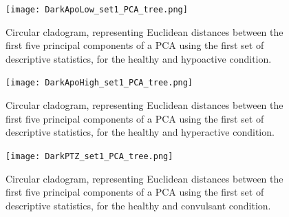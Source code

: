 \documentclass[a4paper,12pt]{article}
\begin{document}
\newpage
\begin{figure}[h!]
\begin{center}
\texttt{[image: DarkApoLow\_set1\_PCA\_tree.png]}
\caption{Circular cladogram, representing Euclidean distances between the first five principal components of a PCA using the first set of descriptive statistics, for the healthy and hypoactive condition.}
\end{center}
\end{figure}
\begin{figure}[h!]
\begin{center}
\texttt{[image: DarkApoHigh\_set1\_PCA\_tree.png]}
\caption{Circular cladogram, representing Euclidean distances between the first five principal components of a PCA using the first set of descriptive statistics, for the healthy and hyperactive condition.}
\end{center}
\end{figure}
\newpage
\begin{figure}[h!]
\begin{center}
\texttt{[image: DarkPTZ\_set1\_PCA\_tree.png]}
\caption{Circular cladogram, representing Euclidean distances between the first five principal components of a PCA using the first set of descriptive statistics, for the healthy and convulsant condition.}
\end{center}
\end{figure}
\end{document}
